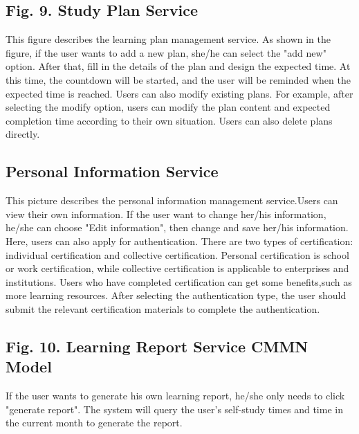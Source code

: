 \documentclass[runningheads]{llncs}
\begin{document}
\subsection{Fig. 9. Study Plan Service}
This figure describes the learning plan management service. As shown in the figure, if the user wants to add a new plan, she/he can select the "add new" option. After that, fill in the details of the plan and design the expected time. At this time, the countdown will be started, and the user will be reminded when the expected time is reached. Users can also modify existing plans. For example, after selecting the modify option, users can modify the plan content and expected completion time according to their own situation. Users can also delete plans directly.
\subsection{Personal Information Service}
This picture describes the personal information management service.Users can view their own information. If the user want to change her/his information, he/she can choose "Edit information", then change and save her/his information. Here, users can also apply for authentication. There are two types of certification: individual certification and collective certification. Personal certification is school or work certification, while collective certification is applicable to enterprises and institutions. Users who have completed certification can get some benefits,such as more learning resources. After selecting the authentication type, the user should submit the relevant certification materials to complete the authentication.
\subsection{Fig. 10. Learning Report Service CMMN Model}
If the user wants to generate his own learning report, he/she only needs to click "generate report". The system will query the user's self-study times and time in the current month to generate the report.
\end{document}
